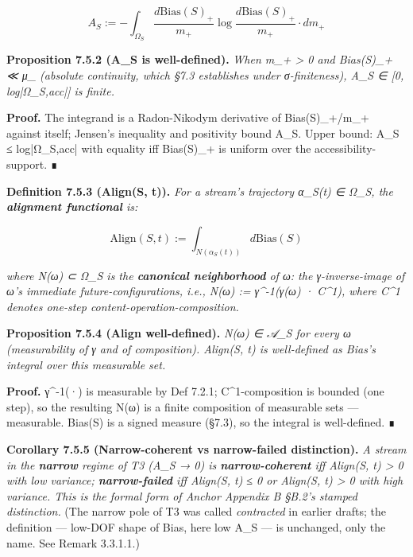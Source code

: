 \documentclass[11pt, openany]{book}
\begin{document}
\[
A_S := -\int_{\Omega_S} \frac{d\mathrm{Bias}(S)_+}{m_+} \log \frac{d\mathrm{Bias}(S)_+}{m_+} \cdot dm_+
\]

\textbf{Proposition 7.5.2 (A\_\allowbreak{}S is well-defined).} \textit{When m\_\allowbreak{}+ > 0 and Bias(S)\_\allowbreak{}+ ≪ μ\_ (absolute continuity, which §7.3 establishes under σ-finiteness), A\_\allowbreak{}S ∈ [0, log|Ω\_\allowbreak{}S,acc|] is finite.}

\textbf{Proof.} The integrand is a Radon-Nikodym derivative of Bias(S)\_\allowbreak{}+/m\_\allowbreak{}+ against itself; Jensen's inequality and positivity bound A\_\allowbreak{}S. Upper bound: A\_\allowbreak{}S ≤ log|Ω\_\allowbreak{}S,acc| with equality iff Bias(S)\_\allowbreak{}+ is uniform over the accessibility-support. ∎

\textbf{Definition 7.5.3 (Align(S, t)).} \textit{For a stream's trajectory α\_\allowbreak{}S(t) ∈ Ω\_\allowbreak{}S, the \textbf{alignment functional} is:}

\[
\mathrm{Align}(S, t) := \int_{N(\alpha_S(t))} d\mathrm{Bias}(S)
\]

\textit{where N(ω) ⊂ Ω\_\allowbreak{}S is the \textbf{canonical neighborhood} of ω: the γ-inverse-image of ω's immediate future-configurations, i.e., N(ω) := γ\textasciicircum{}{-1}(γ(ω) · C\textasciicircum{}1), where C\textasciicircum{}1 denotes one-step content-operation-composition.}

\textbf{Proposition 7.5.4 (Align well-defined).} \textit{N(ω) ∈ 𝒜\_\allowbreak{}S for every ω (measurability of γ and of composition). Align(S, t) is well-defined as Bias's integral over this measurable set.}

\textbf{Proof.} γ\textasciicircum{}{-1}(·) is measurable by Def 7.2.1; C\textasciicircum{}1-composition is bounded (one step), so the resulting N(ω) is a finite composition of measurable sets --- measurable. Bias(S) is a signed measure (§7.3), so the integral is well-defined. ∎

\textbf{Corollary 7.5.5 (Narrow-coherent vs narrow-failed distinction).} \textit{A stream in the \textbf{narrow} regime of T3 (A\_\allowbreak{}S → 0) is \textbf{narrow-coherent} iff Align(S, t) > 0 with low variance; \textbf{narrow-failed} iff Align(S, t) ≤ 0 or Align(S, t) > 0 with high variance. This is the formal form of Anchor Appendix B §B.2's stamped distinction.} (The narrow pole of T3 was called \textit{contracted} in earlier drafts; the definition --- low-DOF shape of Bias, here low A\_\allowbreak{}S --- is unchanged, only the name. See Remark 3.3.1.1.)
\end{document}
